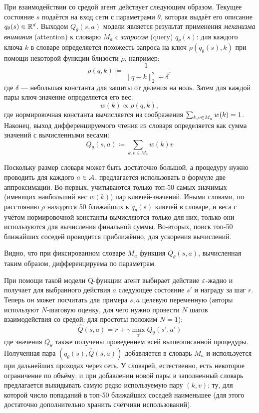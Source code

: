 При взаимодействии со средой агент действует следующим образом. Текущее состояние $s$ подаётся на вход сети с параметрами $\theta$, которая выдаёт его описание $q_{\theta}(s) \in \mathbb{R}^d$. Выходом $Q_{\theta}(s, a)$ модели является результат применения \emph{механизма внимания} (attention) к словарю $M_a$ с \emph{запросом} (query) $q_{\theta}(s)$: для каждого ключа $k$ в словаре определяется похожесть запроса на ключ $\rho(q_{\theta}(s), k)$ при помощи некоторой функции близости $\rho$, например:
$$\rho(q, k) \coloneqq \frac{1}{\|q - k\|_2^2 + \delta},$$
где $\delta$ --- небольшая константа для защиты от деления на ноль. Затем для каждой пары ключ-значение определяется его вес:
$$w(k) \propto \rho(q, k),$$
где нормировочная константа вычисляется из соображения $\sum_{k, v \in M_a} w(k) \HM= 1$. Наконец, выход дифференцируемого чтения из словаря определяется как сумма значений с вычисленными весами:
$$Q_{\theta}(s, a) \coloneqq \sum_{k, v \in M_a} w(k)v$$

Поскольку размер словаря может быть достаточно большой, а процедуру нужно проводить для каждого $a \in \mathcal{A}$, предлагается использовать в формуле две аппроксимации. Во-первых, учитываются только топ-50 самых значимых (имеющих наибольший вес $w(k)$) пар ключей-значений. Иными словами, по расстоянию $\rho$ находятся 50 ближайших к $q_{\theta}(s)$ ключей в словаре, и веса с учётом нормировочной константы вычисляются только для них; только они используются для вычисления финальной суммы. Во-вторых, поиск топ-50 ближайших соседей проводится приближённо, для ускорения вычислений.

Видно, что при фиксированном словаре $M_a$ функция $Q_{\theta}(s, a)$, вычисленная таким образом, дифференцируема по параметрам.

При помощи такой модели Q-функции агент выбирает действие $\varepsilon$-жадно и получает для выбранного действия $a$ следующее состояние $s'$ и награду за шаг $r$. Теперь он может посчитать для примера $s, a$ целевую переменную (авторы используют $N$-шаговую оценку, для чего нужно провести $N$ шагов взаимодействия со средой; для простоты положим $N=1$):
$$\hat{Q}(s, a) = r + \gamma \max_{a'} Q_{\theta}(s', a')$$
где значения $Q_{\theta}$ также получены проведением всей вышеописанной процедуры. Полученная пара $(q_{\theta}(s), \hat{Q}(s, a))$ добавляется в словарь $M_a$ и используется при дальнейших проходах через сеть. У словарей, естественно, есть некоторое ограничение по объёму, и при добавлении новой пары в заполненный словарь предлагается выкидывать самую редко используемую пару $(k, v)$: ту, для которой число попаданий в топ-50 ближайших соседей наименьшее (для этого достаточно дополнительно хранить счётчики использований).


